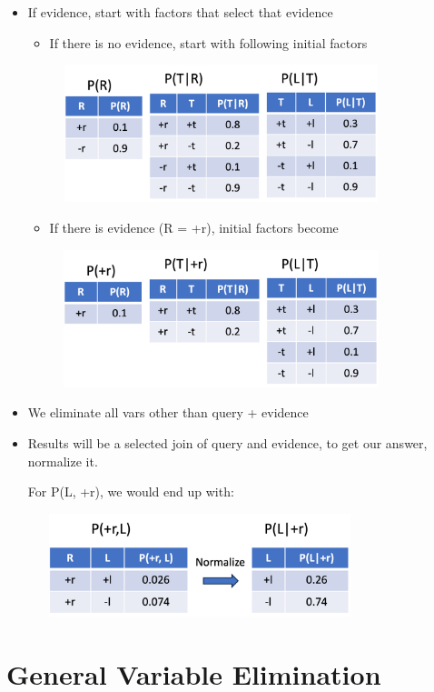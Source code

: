\documentclass[11pt,a4paper]{report}
\begin{document}
\begin{itemize}
    \item If evidence, start with factors that select that evidence
    \begin{itemize}
        \item If there is no evidence, start with following initial factors
        
        \includegraphics[width=10cm, height = 4cm]{no_evidence.png}

        \item If there is evidence (R = +r), initial factors become
        
        \includegraphics[width=10cm, height = 4cm]{evidence.png}
    \end{itemize}

    \item We eliminate all vars other than query + evidence
    \item Results will be a selected join of query and evidence, to get our answer, normalize it.
    
    For P(L, +r), we would end up with:

    \includegraphics[width=10cm, height = 3cm]{evidence_res.png}

\end{itemize}

\section{General Variable Elimination}
\end{document}
